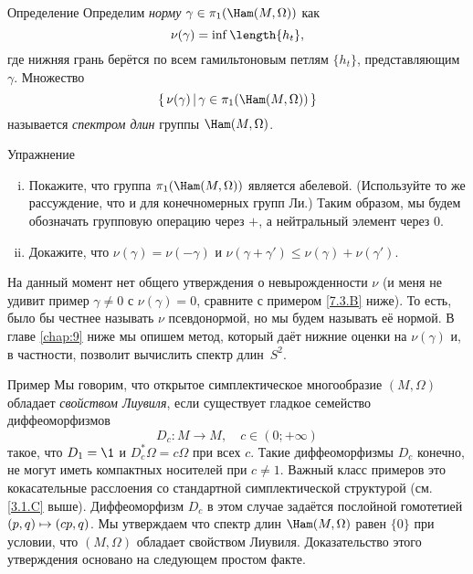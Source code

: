 \begin{ex}{Определение}\label{7.3.A}
Определим {}\emph{норму} $\gamma \in \pi_1 (\Ham (M, \Omega))$ как \index[symb]{$\nu(\gamma)$}
\[\nu(\gamma)=\inf\length\{h_t\},\]
где нижняя грань берётся по всем гамильтоновым петлям $\{h_t\}$, представляющим $\gamma$.
Множество 
\[\set{\nu (\gamma)}{\gamma \in \pi_1 (\Ham (M, \Omega))}\]
называется \emph{спектром длин} группы $\Ham (M, \Omega)$.
\end{ex}

\begin{ex*}{Упражнение}

\begin{enumerate}[(i)]
 \item Покажите, что группа $\pi_1 (\Ham (M, \Omega))$ является абелевой. (Используйте то же рассуждение, что и для конечномерных групп Ли.)
Таким образом, мы будем обозначать групповую операцию через $+$, а нейтральный элемент через $0$.
 \item Докажите, что $\nu (\gamma) = \nu (-\gamma)$ и $\nu (\gamma + \gamma') \le \nu (\gamma) + \nu (\gamma')$.
\end{enumerate}

\end{ex*}

На данный момент нет общего утверждения о невырожденности $\nu$ (и
меня не удивит пример $\gamma \ne 0$ с $\nu (\gamma) = 0$, сравните с
примером \ref{7.3.B} ниже). 
То есть, было бы честнее называть $\nu$ псевдонормой, но мы будем
называть её нормой. 
В главе \ref{chap:9} ниже мы опишем метод, который даёт нижние оценки
на $\nu (\gamma)$ и, в частности, позволит вычислить спектр
длин~$S^2$. 

\begin{ex}{Пример}\label{7.3.B}
Мы говорим, что открытое симплектическое многообразие $(M, \Omega)$
обладает \emph{свойством Лиувиля}, если
существует гладкое семейство диффеоморфизмов 
\[D_c: M \to M,\quad c \in (0; + \infty)\]
такое, что $D_1 = \1$ и $D_c^\ast \Omega = c\Omega$ при всех $c$.
Такие диффеоморфизмы $D_c$ конечно, не могут иметь компактных
носителей при $c \ne 1$. 
Важный класс примеров это кокасательные расслоения со стандартной
симплектической структурой (см. \ref{3.1.C} выше).
Диффеоморфизм $D_c$ в этом случае задаётся послойной гомотетией $(p,
q) \z\mapsto (cp, q)$. 
Мы утверждаем что спектр длин $\Ham (M, \Omega)$ равен $\{0\}$ при
условии, что $(M, \Omega)$ 
обладает свойством Лиувиля.
Доказательство этого утверждения основано на следующем простом факте.
\end{ex}

